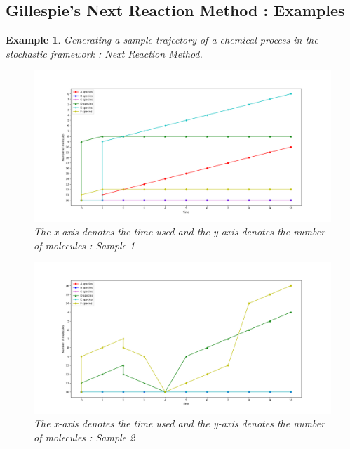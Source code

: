 \documentclass[11pt,a4paper]{article}
\newtheorem{example}[theorem]{Example}
\begin{document}
\subsection{Gillespie's Next Reaction Method : Examples}
\begin{example}{Generating a sample trajectory of a chemical process in the stochastic framework : Next Reaction Method.}
    \begin{figure}[!h]
    \centering
    \includegraphics[width=1\textwidth]{Images/Figure_1_Next_reaction.png}
    \caption{The x-axis denotes the time used and the y-axis denotes the number of molecules : Sample 1}
    \label{fig: sample trajectory}
    \end{figure}

    \begin{figure}[!h]
    \centering
    \includegraphics[width=1\textwidth]{Images/Figure_5_Next_reaction.png}
    \caption{The x-axis denotes the time used and the y-axis denotes the number of molecules : Sample 2}
    \label{fig: sample trajectory}
    \end{figure}
\end{example}
\end{document}
